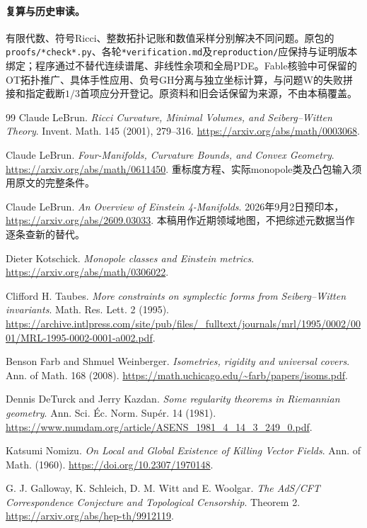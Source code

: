 \documentclass[UTF8,fontset=fandol,zihao=-4]{ctexart}
\theoremstyle{cn}
\begin{document}
\paragraph{复算与历史审读。}
有限代数、符号Ricci、整数拓扑记账和数值采样分别解决不同问题。原包的\nolinkurl{proofs/*check*.py}、各轮\nolinkurl{*verification.md}及\nolinkurl{reproduction/}应保持与证明版本绑定；程序通过不替代连续谱尾、非线性余项和全局PDE。Fable核验中可保留的OT拓扑推广、具体手性应用、负号GH分离与独立坐标计算，与问题W的失败拼接和指定截断$1/3$首项应分开登记。原资料和旧会话保留为来源，不由本稿覆盖。
\begin{thebibliography}{99}
 Claude LeBrun. \emph{Ricci Curvature, Minimal Volumes, and Seiberg--Witten Theory}. Invent. Math. 145 (2001), 279--316. \url{https://arxiv.org/abs/math/0003068}.

 Claude LeBrun. \emph{Four-Manifolds, Curvature Bounds, and Convex Geometry}. \url{https://arxiv.org/abs/math/0611450}. 重标度方程、实际monopole类及凸包输入须用原文的完整条件。

 Claude LeBrun. \emph{An Overview of Einstein 4-Manifolds}. 2026年9月2日预印本，\url{https://arxiv.org/abs/2609.03033}. 本稿用作近期领域地图，不把综述元数据当作逐条查新的替代。

 Dieter Kotschick. \emph{Monopole classes and Einstein metrics}. \url{https://arxiv.org/abs/math/0306022}.

 Clifford H. Taubes. \emph{More constraints on symplectic forms from Seiberg--Witten invariants}. Math. Res. Lett. 2 (1995). \url{https://archive.intlpress.com/site/pub/files/_fulltext/journals/mrl/1995/0002/0001/MRL-1995-0002-0001-a002.pdf}.

 Benson Farb and Shmuel Weinberger. \emph{Isometries, rigidity and universal covers}. Ann. of Math. 168 (2008). \url{https://math.uchicago.edu/~farb/papers/isoms.pdf}.

 Dennis DeTurck and Jerry Kazdan. \emph{Some regularity theorems in Riemannian geometry}. Ann. Sci. Éc. Norm. Supér. 14 (1981). \url{https://www.numdam.org/article/ASENS_1981_4_14_3_249_0.pdf}.

 Katsumi Nomizu. \emph{On Local and Global Existence of Killing Vector Fields}. Ann. of Math. (1960). \url{https://doi.org/10.2307/1970148}.

 G. J. Galloway, K. Schleich, D. M. Witt and E. Woolgar. \emph{The AdS/CFT Correspondence Conjecture and Topological Censorship}. Theorem 2. \url{https://arxiv.org/abs/hep-th/9912119}.


\end{thebibliography}
\end{document}
